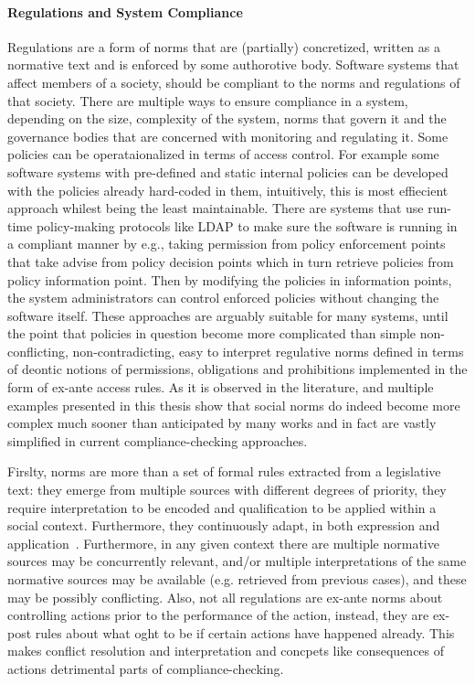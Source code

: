 \paragraph{Regulations and System Compliance}
Regulations are a form of norms that are (partially) concretized, written as a normative text and is enforced by some authorotive body.  Software systems that affect members of a society, should be compliant to the norms and regulations of that society. There are multiple ways to ensure compliance in a system, depending on the size, complexity of the system, norms that govern it and the governance bodies that are concerned with monitoring and regulating it. Some policies can be operataionalized in terms of access control. For example some software systems with pre-defined and static internal policies can be developed with the policies already hard-coded in them, intuitively, this is most effiecient approach whilest being the least maintainable. There are systems that use run-time policy-making protocols like LDAP to make sure the software is running in a compliant manner by e.g., taking permission from policy enforcement points that take advise from policy decision points which in turn retrieve policies from policy information point. Then by modifying the policies in information points, the system administrators can control enforced policies without changing the software itself. These approaches are arguably suitable for many systems, until the point that policies in question become more complicated than simple non-conflicting, non-contradicting, easy to interpret regulative norms defined in terms of deontic notions of permissions, obligations and prohibitions implemented in the form of ex-ante access rules. As it is observed in the literature, and multiple examples presented in this thesis show that social norms do indeed become more complex much sooner than anticipated by many works and in fact are vastly simplified in current compliance-checking approaches. 


Firslty, norms are more than a set of formal rules extracted from a legislative text: they emerge from multiple sources with different degrees of priority, they require interpretation to be encoded and qualification to be applied within a social context. Furthermore, they continuously adapt, in both expression and application~\cite{Boella2014APractice}. Furthermore, in any given context there are multiple normative sources may be concurrently relevant, and/or multiple interpretations of the same normative sources may be available (e.g. retrieved from previous cases), and these may be possibly conflicting. Also, not all regulations are ex-ante norms about controlling actions prior to the performance of the action, instead, they are ex-post rules about what oght to be if certain actions have happened already. This makes conflict resolution and interpretation and concpets like consequences of actions detrimental parts of compliance-checking.


